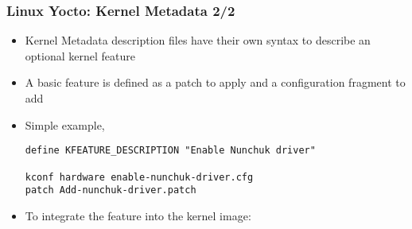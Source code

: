 \begin{frame}[fragile]
  \frametitle{Linux Yocto: Kernel Metadata 2/2}
  \begin{itemize}
    \item Kernel Metadata description files have their own syntax to describe an optional kernel feature
    \item A basic feature is defined as a patch to apply and a
      configuration fragment to add
    \item Simple example, 
      \begin{block}{}
        \begin{verbatim}
define KFEATURE_DESCRIPTION "Enable Nunchuk driver"

kconf hardware enable-nunchuk-driver.cfg
patch Add-nunchuk-driver.patch
        \end{verbatim}
      \end{block}
    \item To integrate the feature into the kernel image:
  \end{itemize}
\end{frame}
